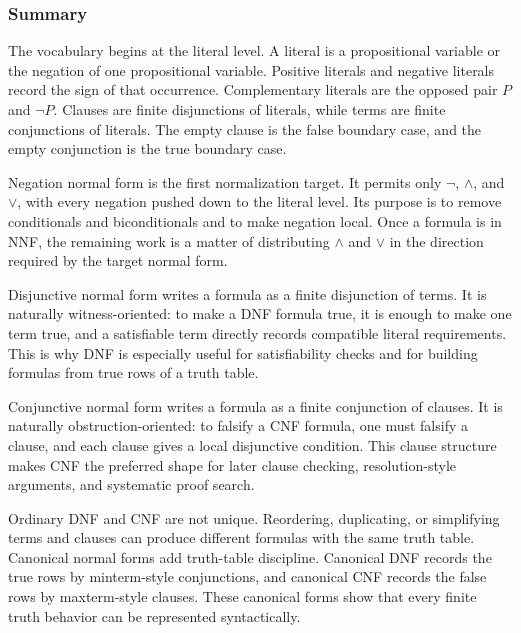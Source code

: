 \subsubsection*{Summary}

\begin{remark*}
The vocabulary begins at the literal level. A literal is a propositional
variable or the negation of one propositional variable. Positive literals and
negative literals record the sign of that occurrence. Complementary literals
are the opposed pair \(P\) and \(\neg P\). Clauses are finite disjunctions of
literals, while terms are finite conjunctions of literals. The empty clause is
the false boundary case, and the empty conjunction is the true boundary case.
\end{remark*}

\begin{remark*}
Negation normal form is the first normalization target. It permits only
\(\neg\), \(\land\), and \(\lor\), with every negation pushed down to the
literal level. Its purpose is to remove conditionals and biconditionals and to
make negation local. Once a formula is in NNF, the remaining work is a matter
of distributing \(\land\) and \(\lor\) in the direction required by the target
normal form.
\end{remark*}

\begin{remark*}
Disjunctive normal form writes a formula as a finite disjunction of terms. It
is naturally witness-oriented: to make a DNF formula true, it is enough to make
one term true, and a satisfiable term directly records compatible literal
requirements. This is why DNF is especially useful for satisfiability checks
and for building formulas from true rows of a truth table.
\end{remark*}

\begin{remark*}
Conjunctive normal form writes a formula as a finite conjunction of clauses. It
is naturally obstruction-oriented: to falsify a CNF formula, one must falsify a
clause, and each clause gives a local disjunctive condition. This clause
structure makes CNF the preferred shape for later clause checking,
resolution-style arguments, and systematic proof search.
\end{remark*}

\begin{remark*}
Ordinary DNF and CNF are not unique. Reordering, duplicating, or simplifying
terms and clauses can produce different formulas with the same truth table.
Canonical normal forms add truth-table discipline. Canonical DNF records the
true rows by minterm-style conjunctions, and canonical CNF records the false
rows by maxterm-style clauses. These canonical forms show that every finite
truth behavior can be represented syntactically.
\end{remark*}

